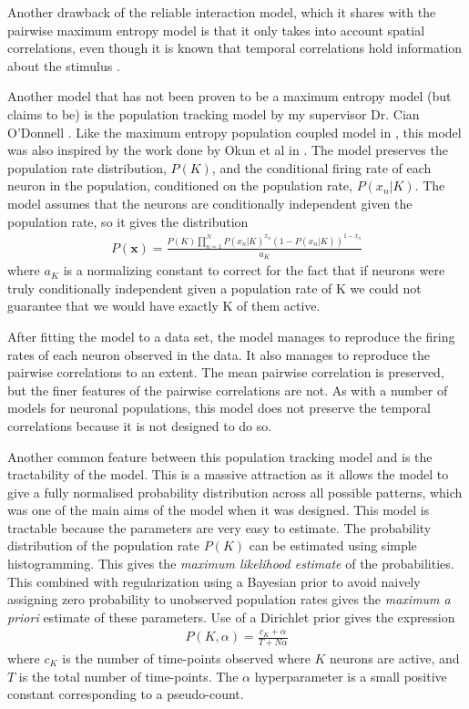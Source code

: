 \documentclass[a4paper,12pt]{article}
\theoremstyle{definition}
\begin{document}
	Another drawback of the reliable interaction model, which it shares with the pairwise maximum entropy model is that it only takes into account spatial correlations, even though it is known that temporal correlations hold information about the stimulus \cite{schwartz}.
	
	Another model that has not been proven to be a maximum entropy model (but claims to be) is the population tracking model by my supervisor Dr. Cian O'Donnell \cite{odonnell}. Like the maximum entropy population coupled model in \cite{gardella}, this model was also inspired by the work done by Okun et al in \cite{okun}. The model preserves the population rate distribution, $P(K)$, and the conditional firing rate of each neuron in the population, conditioned on the population rate, $P(x_n | K)$. The model assumes that the neurons are conditionally independent given the population rate, so it gives the distribution
	\begin{align}
	P(\mathbf{x}) = \frac{P(K)\prod_{n=1}^N P(x_n | K)^{x_n}(1 - P(x_n | K))^{1-x_n}}{a_K}
	\end{align} 
	where $a_K$ is a normalizing constant to correct for the fact that if neurons were truly conditionally independent given a population rate of K we could not guarantee that we would have exactly K of them active.
	
	After fitting the model to a data set, the model manages to reproduce the firing rates of each neuron observed in the data. It also manages to reproduce the pairwise correlations to an extent. The mean pairwise correlation is preserved, but the finer features of the pairwise correlations are not. As with a number of models for neuronal populations, this model does not preserve the temporal correlations because it is not designed to do so.
	
	Another common feature between this population tracking model and \cite{gardella} is the tractability of the model. This is a massive attraction as it allows the model to give a fully normalised probability distribution across all possible patterns, which was one of the main aims of the model when it was designed. This model is tractable because the parameters are very easy to estimate. The probability distribution of the population rate $P(K)$ can be estimated using simple histogramming. This gives the \textit{maximum likelihood estimate} of the probabilities. This combined with regularization using a Bayesian prior to avoid naively assigning zero probability to unobserved population rates gives the \textit{maximum a priori} estimate of these parameters. Use of a Dirichlet prior gives the expression
	\begin{align}
	P(K, \alpha) = \frac{c_K + \alpha}{T + N\alpha}
	\end{align}
	where $c_K$ is the number of time-points observed where $K$ neurons are active, and $T$ is the total number of time-points. The $\alpha$ hyperparameter is a small positive constant corresponding to a pseudo-count. 
	
\end{document}
